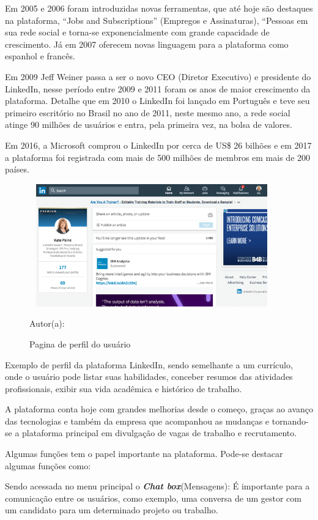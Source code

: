 Em 2005 e 2006 foram introduzidas novas ferramentas, que até hoje são destaques na plataforma, “Jobs and Subscriptions” (Empregos e Assinaturas), “Pessoas em sua rede social e torna-se exponencialmente com grande capacidade de crescimento. Já em 2007 oferecem novas linguagem para a plataforma como espanhol e francês.

Em 2009 Jeff Weiner passa a ser o novo CEO (Diretor Executivo) e presidente do LinkedIn, nesse período entre 2009 e 2011 foram os anos de maior crescimento da plataforma. Detalhe que em 2010 o LinkedIn foi lançado em Português e teve seu primeiro escritório no Brasil no ano de 2011, neste mesmo ano, a rede social atinge 90 milhões de usuários e entra, pela primeira vez, na bolsa de valores.

Em 2016, a Microsoft comprou o LinkedIn por cerca de US\$ 26 bilhões e em 2017 a plataforma foi registrada com mais de 500 milhões de membros em mais de 200 países.

\begin{figure}[!h]
	\centering
	\caption{Pagina de perfil do usuário }
	\includegraphics[width=400px, height=200px]{./images/linkedin1.png}
	\par {Autor(a): \cite{linkedin}}
\end{figure}

\newpage

Exemplo de perfil da plataforma LinkedIn, sendo semelhante a um currículo, onde o usuário pode listar suas habilidades, conceber resumos das atividades profissionais, exibir sua vida acadêmica e histórico de trabalho.
 
A plataforma conta hoje com grandes melhorias desde o começo, graças ao avanço das tecnologias e também da empresa que acompanhou as mudanças e tornando-se a plataforma principal em divulgação de vagas de trabalho e recrutamento. 

Algumas funções tem o papel importante na plataforma. Pode-se destacar algumas funções como:

Sendo acessada no menu principal o \textbf{\emph{Chat box}}(Mensagens): É importante para a comunicação entre os usuários, como exemplo, uma conversa de um gestor com um candidato para um determinado projeto ou trabalho.

